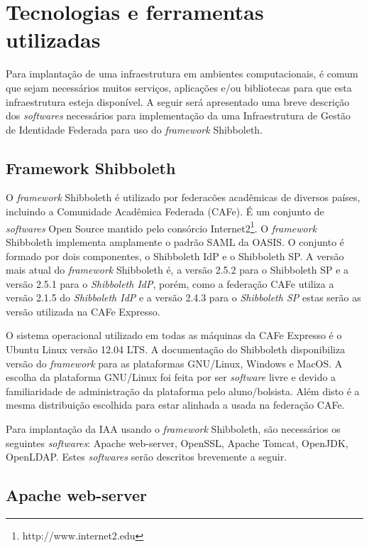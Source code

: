 \section{Tecnologias e ferramentas utilizadas}
\label{s_c4_tecnologias}

Para implantação de uma infraestrutura em ambientes computacionais, é comum que sejam necessários muitos serviços, aplicações e/ou bibliotecas para que esta infraestrutura esteja disponível. A seguir será apresentado uma breve descrição dos \textit{softwares} necessários para implementação da uma Infraestrutura de Gestão de Identidade Federada para uso do \textit{framework} Shibboleth.

\subsection{Framework Shibboleth}

O \textit{framework} Shibboleth \cite{shibb:05} é utilizado por federacões acadêmicas de diversos países, incluindo a Comunidade Acadêmica Federada (CAFe). É um conjunto de \textit{softwares} Open Source mantido pelo consórcio Internet2\footnote{http://www.internet2.edu}. O \textit{framework} Shibboleth implementa amplamente o padrão SAML da OASIS. O conjunto é formado por dois componentes, o Shibboleth IdP e o Shibboleth SP. A versão mais atual do \textit{framework} Shibboleth é, a versão 2.5.2 para o Shibboleth SP e a versão 2.5.1 para o \textit{Shibboleth IdP}, porém, como a federação CAFe utiliza a versão 2.1.5 do \textit{Shibboleth IdP} e a versão 2.4.3 para o \textit{Shibboleth SP} estas serão as versão utilizada na CAFe Expresso.

O sistema operacional utilizado em todas as máquinas da CAFe Expresso é o Ubuntu Linux versão 12.04 LTS. A documentação do Shibboleth disponibiliza versão do \textit{framework} para as plataformas GNU/Linux, Windows e MacOS. A escolha da plataforma GNU/Linux foi feita por ser \textit{software} livre e devido a familiaridade de administração da plataforma pelo aluno/bolsista. Além disto é a mesma distribuição escolhida para estar alinhada a usada na federação CAFe.

Para implantação da \acf{IAA} usando o \textit{framework} Shibboleth, são necessários os seguintes \textit{softwares}: Apache web-server, OpenSSL, Apache Tomcat, OpenJDK, OpenLDAP. Estes \textit{softwares} serão descritos brevemente a seguir.

\subsection{Apache web-server}


